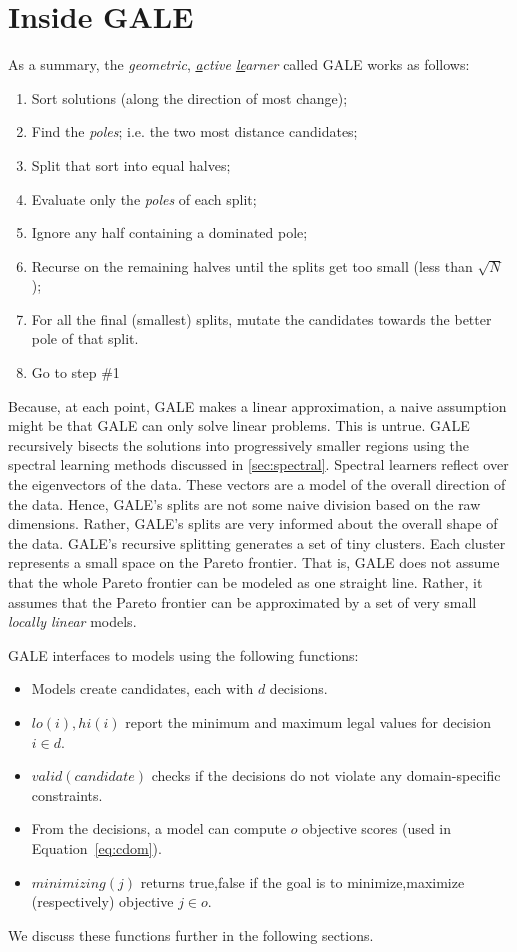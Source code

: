 \documentclass[10pt,journal,compsoc]{IEEEtran}
\newcommand{\eq}[1]{Equation~\ref{eq:#1}}
\newcommand{\bi}{\begin{itemize}}
\newcommand{\ei}{\end{itemize}}
\newcommand{\be}{\begin{enumerate}}
\newcommand{\ee}{\end{enumerate}}
\newcommand{\tion}[1]{\textsection\ref{sec:#1}}
\begin{document}
\section{Inside GALE}

As a summary, the  {\em \underline{g}eometric}, {\em \underline{a}ctive \underline{le}arner} called GALE works as follows:
 
\be
\item Sort solutions (along the direction of most change);
\item Find the {\em poles}; i.e. the two most distance candidates;
\item Split that sort into equal halves;
\item Evaluate only the {\em poles} of each split;
\item Ignore any half containing a dominated pole;
\item Recurse on the remaining halves until the splits get too small (less than $\sqrt{N}$);
\item For all the final (smallest) splits,
  mutate the candidates towards the better pole of
  that split. 
\item Go to step \#1 \ee 
 
\noindent

Because, at each point, GALE makes a linear approximation, a naive assumption might be that GALE can only solve linear problems.
This is untrue.
GALE recursively bisects the solutions into progressively smaller regions using the spectral learning methods discussed in \tion{spectral}. Spectral learners reflect over the eigenvectors of the data.
These vectors are a model of the overall direction of the data.  
Hence, GALE's splits are not some naive division based on the raw dimensions. 
Rather, GALE's splits are very informed about the overall shape of the data. 
GALE's recursive splitting generates a set of tiny clusters. Each cluster represents a small space on the Pareto frontier.  
That is, GALE does not assume that the whole Pareto frontier can be modeled as one straight line. 
Rather, it assumes that the Pareto frontier can be approximated by a set of very small {\em locally linear} models.

GALE interfaces to models using the following functions:
\bi
\item Models create candidates, each  with $d$ decisions. 
\item $\mathit{lo}(i), \mathit{hi}(i)$ report the minimum and maximum
legal values for decision $i\in d$.
\item $\mathit{valid}(\mathit{candidate})$ 
checks if the decisions
do not violate any domain-specific constraints.
\item  From the decisions,
a model can compute $o$  objective scores (used in \eq{cdom}).
\item $\mathit{minimizing}(j)$ returns true,false if the goal
is to minimize,maximize (respectively) objective $j \in o$.
\ei
We discuss these functions further in the following sections.
\end{document}
